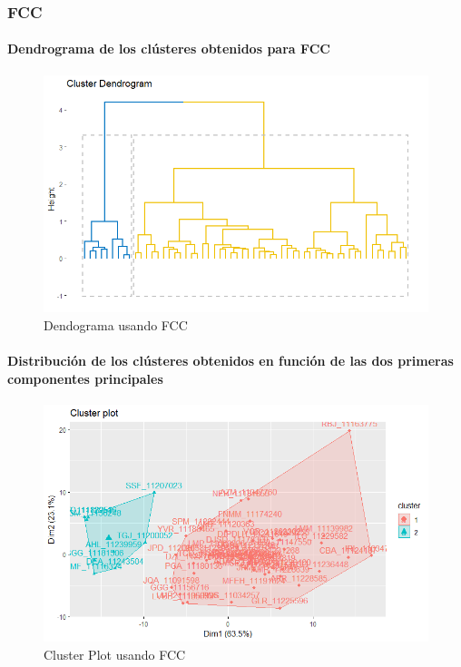 \subsubsection{FCC}

\paragraph{Dendrograma de los clústeres obtenidos para FCC}

\begin{figure}[H]
    \centering
    \includegraphics[scale = 0.8]{img/06-1-ccf.png}
    \caption{Dendograma usando FCC}
    \label{fig:ccf_den}
\end{figure}

\paragraph{Distribución de los clústeres obtenidos en función de las dos primeras componentes principales}

\begin{figure}[H]
    \centering
    \includegraphics[scale = 0.8]{img/06-2-ccf.png}
    \caption{Cluster Plot usando FCC}
    \label{fig:ccf_pc}
\end{figure}

